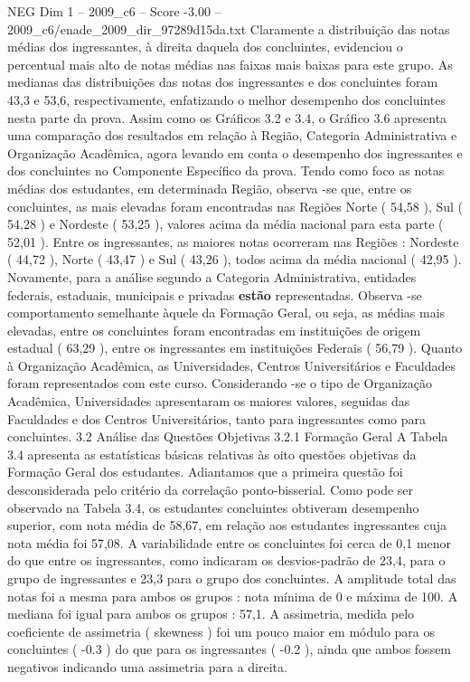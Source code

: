 \begin{textsample}{NEG Dim 1 – 2009\_c6 – Score -3.00 – 2009\_c6/enade\_2009\_dir\_97289d15da.txt}
Claramente a distribuição das notas médias dos ingressantes, à direita daquela dos concluintes, evidenciou o percentual mais alto de notas médias nas faixas mais baixas para este grupo.
As medianas das distribuições das notas dos ingressantes e dos concluintes foram 43,3 e 53,6, respectivamente, enfatizando o melhor desempenho dos concluintes nesta parte da prova.
Assim como os Gráficos 3.2 e 3.4, o Gráfico 3.6 apresenta uma comparação dos resultados em relação à Região, Categoria Administrativa e Organização Acadêmica, agora levando em conta o desempenho dos ingressantes e dos concluintes no Componente Específico da prova.
Tendo como foco as notas médias dos estudantes, em determinada Região, observa -se que, entre os concluintes, as mais elevadas foram encontradas nas Regiões Norte ( 54,58 ), Sul ( 54,28 ) e Nordeste ( 53,25 ), valores acima da média nacional para esta parte ( 52,01 ).
Entre os ingressantes, as maiores notas ocorreram nas Regiões : Nordeste ( 44,72 ), Norte ( 43,47 ) e Sul ( 43,26 ), todos acima da média nacional ( 42,95 ).
Novamente, para a análise segundo a Categoria Administrativa, entidades federais, estaduais, municipais e privadas \textbf{estão} representadas.
Observa -se comportamento semelhante àquele da Formação Geral, ou seja, as médias mais elevadas, entre os concluintes foram encontradas em instituições de origem estadual ( 63,29 ), entre os ingressantes em instituições Federais ( 56,79 ).
Quanto à Organização Acadêmica, as Universidades, Centros Universitários e Faculdades foram representados com este curso.
Considerando -se o tipo de Organização Acadêmica, Universidades apresentaram os maiores valores, seguidas das Faculdades e dos Centros Universitários, tanto para ingressantes como para concluintes. 3.2 Análise das Questões Objetivas 3.2.1 Formação Geral A Tabela 3.4 apresenta as estatísticas básicas relativas às oito questões objetivas da Formação Geral dos estudantes.
Adiantamos que a primeira questão foi desconsiderada pelo critério da correlação ponto-bisserial.
Como pode ser observado na Tabela 3.4, os estudantes concluintes obtiveram desempenho superior, com nota média de 58,67, em relação aos estudantes ingressantes cuja nota média foi 57,08.
A variabilidade entre os concluintes foi cerca de 0,1 menor do que entre os ingressantes, como indicaram os desvios-padrão de 23,4, para o grupo de ingressantes e 23,3 para o grupo dos concluintes.
A amplitude total das notas foi a mesma para ambos os grupos : nota mínima de 0 e máxima de 100.
A mediana foi igual para ambos os grupos : 57,1.
A assimetria, medida pelo coeficiente de assimetria ( skewness ) foi um pouco maior em módulo para os concluintes ( -0.3 ) do que para os ingressantes ( -0.2 ), ainda que ambos fossem negativos indicando uma assimetria para a direita.

\end{textsample}
